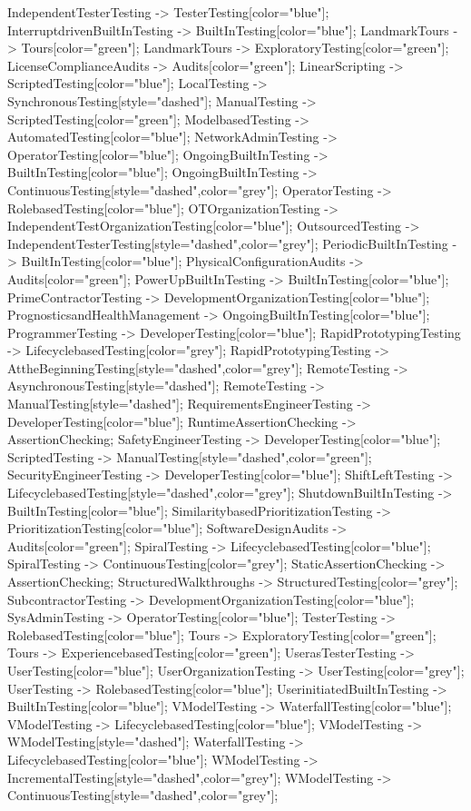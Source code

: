 \documentclass{article}
\begin{document}
{IndependentTesterTesting -> TesterTesting[color="blue"];
InterruptdrivenBuiltInTesting -> BuiltInTesting[color="blue"];
LandmarkTours -> Tours[color="green"];
LandmarkTours -> ExploratoryTesting[color="green"];
LicenseComplianceAudits -> Audits[color="green"];
LinearScripting -> ScriptedTesting[color="blue"];
LocalTesting -> SynchronousTesting[style="dashed"];
ManualTesting -> ScriptedTesting[color="green"];
ModelbasedTesting -> AutomatedTesting[color="blue"];
NetworkAdminTesting -> OperatorTesting[color="blue"];
OngoingBuiltInTesting -> BuiltInTesting[color="blue"];
OngoingBuiltInTesting -> ContinuousTesting[style="dashed",color="grey"];
OperatorTesting -> RolebasedTesting[color="blue"];
OTOrganizationTesting -> IndependentTestOrganizationTesting[color="blue"];
OutsourcedTesting -> IndependentTesterTesting[style="dashed",color="grey"];
PeriodicBuiltInTesting -> BuiltInTesting[color="blue"];
PhysicalConfigurationAudits -> Audits[color="green"];
PowerUpBuiltInTesting -> BuiltInTesting[color="blue"];
PrimeContractorTesting -> DevelopmentOrganizationTesting[color="blue"];
PrognosticsandHealthManagement -> OngoingBuiltInTesting[color="blue"];
ProgrammerTesting -> DeveloperTesting[color="blue"];
RapidPrototypingTesting -> LifecyclebasedTesting[color="grey"];
RapidPrototypingTesting -> AttheBeginningTesting[style="dashed",color="grey"];
RemoteTesting -> AsynchronousTesting[style="dashed"];
RemoteTesting -> ManualTesting[style="dashed"];
RequirementsEngineerTesting -> DeveloperTesting[color="blue"];
RuntimeAssertionChecking -> AssertionChecking;
SafetyEngineerTesting -> DeveloperTesting[color="blue"];
ScriptedTesting -> ManualTesting[style="dashed",color="green"];
SecurityEngineerTesting -> DeveloperTesting[color="blue"];
ShiftLeftTesting -> LifecyclebasedTesting[style="dashed",color="grey"];
ShutdownBuiltInTesting -> BuiltInTesting[color="blue"];
SimilaritybasedPrioritizationTesting -> PrioritizationTesting[color="blue"];
SoftwareDesignAudits -> Audits[color="green"];
SpiralTesting -> LifecyclebasedTesting[color="blue"];
SpiralTesting -> ContinuousTesting[color="grey"];
StaticAssertionChecking -> AssertionChecking;
StructuredWalkthroughs -> StructuredTesting[color="grey"];
SubcontractorTesting -> DevelopmentOrganizationTesting[color="blue"];
SysAdminTesting -> OperatorTesting[color="blue"];
TesterTesting -> RolebasedTesting[color="blue"];
Tours -> ExploratoryTesting[color="green"];
Tours -> ExperiencebasedTesting[color="green"];
UserasTesterTesting -> UserTesting[color="blue"];
UserOrganizationTesting -> UserTesting[color="grey"];
UserTesting -> RolebasedTesting[color="blue"];
UserinitiatedBuiltInTesting -> BuiltInTesting[color="blue"];
VModelTesting -> WaterfallTesting[color="blue"];
VModelTesting -> LifecyclebasedTesting[color="blue"];
VModelTesting -> WModelTesting[style="dashed"];
WaterfallTesting -> LifecyclebasedTesting[color="blue"];
WModelTesting -> IncrementalTesting[style="dashed",color="grey"];
WModelTesting -> ContinuousTesting[style="dashed",color="grey"];

}
\end{document}
